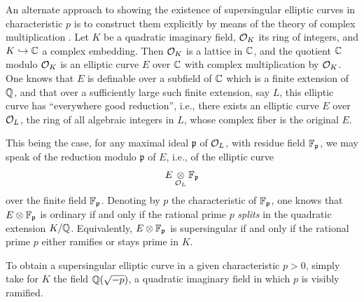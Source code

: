 \begin{remark}\label{rem:2.9.5}
An alternate approach to showing the existence of supersingular elliptic curves in characteristic $p$ is to construct them explicitly by means of the theory of complex multiplication \cite{Deu}. Let $K$ be a quadratic imaginary field, $\mathcal{O}_K$ its ring of integers, and $K \hookrightarrow \mathbb{C}$ a complex embedding. Then $\mathcal{O}_K$ is a lattice in $\mathbb{C}$, and the quotient $\mathbb{C}$ modulo $\mathcal{O}_K$ is an elliptic curve $E$ over $\mathbb{C}$ with complex multiplication by $\mathcal{O}_K$. One knows that $E$ is definable over a subfield of $\mathbb{C}$ which is a finite extension of $\mathbb{Q}$, and that over a sufficiently large such finite extension, say $L$, this elliptic curve has ``everywhere good reduction'', i.e., there exists an elliptic curve $E$ over $\mathcal{O}_L$, the ring of all algebraic integers in $L$, whose complex fiber is the original $E$.

This being the case, for any maximal ideal $\mathfrak{p}$ of $\mathcal{O}_L$, with residue field $\mathbb{F}_{\mathfrak{p}}$, we may speak of the reduction modulo $\mathfrak{p}$ of $E$, i.e., of the elliptic curve
\[
E \underset{\mathcal{O}_L}{\otimes} \mathbb{F}_{\mathfrak{p}}
\]
over the finite field $\mathbb{F}_{\mathfrak{p}}$. Denoting by $p$ the characteristic of $\mathbb{F}_{\mathfrak{p}}$, one knows that $E \otimes \mathbb{F}_{\mathfrak{p}}$ is ordinary if and only if the rational prime $p$ \emph{splits} in the quadratic extension $K/\mathbb{Q}$. Equivalently, $E \otimes \mathbb{F}_{\mathfrak{p}}$ is supersingular if and only if the rational prime $p$ either ramifies or stays prime in $K$.

To obtain a supersingular elliptic curve in a given characteristic $p > 0$, simply take for $K$ the field $\mathbb{Q}(\sqrt{-p})$, a quadratic imaginary field in which $p$ is visibly ramified.
\end{remark}
